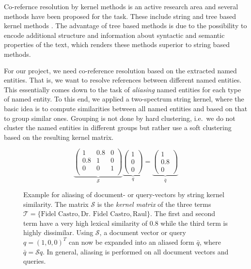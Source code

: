 Co-refernce resolution by kernel methods is an active research area and several methods have been proposed for the task. These include string and tree based kernel methods \cite{string_kernel_coref}.
The advantage of tree based methods is due to the possibility to encode additional structure and information about syntactic and semantic properties of the text, which renders these methods superior to string based methods.

For our project, we need co-reference resolution based on the extracted named entities. That is, we want to resolve references between different named entities. This essentially comes down to the task of \textit{aliasing} named entities for each type of named entity. To this end, we applied a two-spectrum string kernel, where the basic idea is to compute similarities between all named entities and based on that to group similar ones. Grouping is not done by hard clustering, i.e.\ we do not cluster the named entities in different groups but rather use a soft clustering based on the resulting kernel matrix.

\begin{figure}[ht]
  \caption{Example for aliasing of document- or query-vectors by string kernel similarity.
The matrix $\mathcal{S}$ is the \textit{kernel matrix} of the three terms $\mathcal{T} = \lbrace
\text{Fidel Castro},\text{Dr. Fidel Castro}, \text{Raul}\rbrace$. The first and second term have a
very high lexical similarity of $0.8$ while the third term is highly dissimilar. Using
$\mathcal{S}$, a document vector or query $q=(1,0,0)^T$ can now be expanded into an aliased form
$\bar q$, where $\bar q = \mathcal{S}q$. In general, aliasing is performed on all document vectors
and queries.}
  \[
     \underbrace{\begin{pmatrix}
      1   & 0.8 & 0\\
      0.8 & 1   & 0\\
      0   & 0   & 1\\
     \end{pmatrix}}_{\mathcal{S}}
     \underbrace{\begin{pmatrix}
     1\\ 0\\0 
     \end{pmatrix}}_{q}
     =
     \underbrace{\begin{pmatrix}
     1\\ 0.8\\0 
     \end{pmatrix}}_{\bar q}
  \]
  \label{eq:example_string_sim}
\end{figure}

